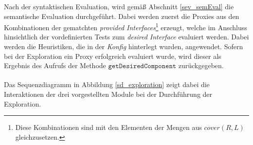 Nach der syntaktischen Evaluation, wird gemäß Abschnitt \ref{sev_semEval} die semantische Evaluation durchgeführt. Dabei werden zuerst die Proxies aus den Kombinationen der gematchten \emph{provided Interfaces}\footnote{Diese Kombinationen sind mit den Elementen der Mengen aus $\mathit{cover(R,L)}$ gleichzusetzen.} erzeugt, welche im Anschluss hinsichtlich der vordefinierten Tests zum \emph{desired Interface} evaluiert werden. Dabei werden die Heuristiken, die in der \emph{Konfig} hinterlegt wurden, angewendet. Sofern bei der Exploration ein Proxy erfolgreich evaluiert wurde, wird dieser als Ergebnis des Aufrufs der Methode $\texttt{getDesiredComponent}$ zurückgegeben. 
\\\\
Das Sequenzdiagramm in Abbildung \ref{sd_exploration} zeigt dabei die Interaktionen der drei vorgestellten Module bei der Durchführung der Exploration.
\begin{figure}
\end{figure}\label{sd_exploration}
\noindent